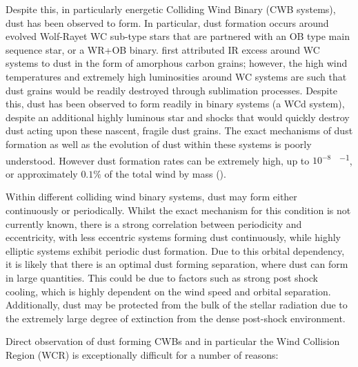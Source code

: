 \documentclass[fleqn,usenatbib]{mnras}
\begin{document}
Despite this, in particularly energetic Colliding Wind Binary (CWB systems), dust has been observed to form.
In particular, dust formation occurs around evolved Wolf-Rayet WC sub-type stars that are partnered with an OB type main sequence star, or a WR+OB binary.
\cite{allenInfraredPhotometryNorthern1972} first attributed IR excess around WC systems to dust in the form of amorphous carbon grains; however, the high wind temperatures and extremely high luminosities around WC systems are such that dust grains would be readily destroyed through sublimation processes.
Despite this, dust has been observed to form readily in binary systems (a WCd system), despite an additional highly luminous star and shocks that would quickly destroy dust acting upon these nascent, fragile dust grains.
The exact mechanisms of dust formation as well as the evolution of dust within these systems is poorly understood.
However dust formation rates can be extremely high, up to $10^{-8}$ \si{\solarmass\per\year}, or approximately $0.1\%$ of the total wind by mass (\cite{lauRevisitingImpactDust2020}).


Within different colliding wind binary systems, dust may form either continuously or periodically.
Whilst the exact mechanism for this condition is not currently known, there is a strong correlation between periodicity and eccentricity, with less eccentric systems forming dust continuously, while highly elliptic systems exhibit periodic dust formation.
Due to this orbital dependency, it is likely that there is an optimal dust forming separation, where dust can form in large quantities. This could be due to factors such as strong post shock cooling, which is highly dependent on the wind speed and orbital separation.
Additionally, dust may be protected from the bulk of the stellar radiation due to the extremely large degree of extinction from the dense post-shock environment.


Direct observation of dust forming CWBs and in particular the Wind Collision Region (WCR) is exceptionally difficult for a number of reasons:
\end{document}

